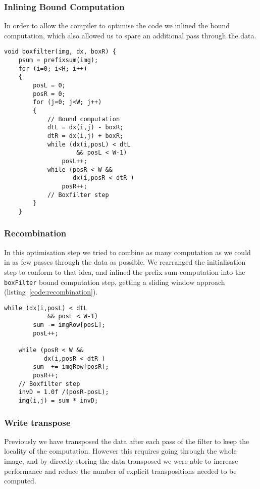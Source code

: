 \subsubsection{Inlining Bound Computation}

In order to allow the compiler to optimise the code we inlined the bound computation, which also allowed us to spare an additional pass through the data.

\begin{lstlisting}[caption=Inlining of the bound computation, label=code:inlining]
void boxfilter(img, dx, boxR) {
    psum = prefixsum(img);
    for (i=0; i<H; i++)
    {
        posL = 0;
        posR = 0;
        for (j=0; j<W; j++)
        {
            // Bound computation
            dtL = dx(i,j) - boxR;
            dtR = dx(i,j) + boxR;
            while (dx(i,posL) < dtL 
                    && posL < W-1)
                posL++;
            while (posR < W && 
                   dx(i,posR < dtR )
                posR++;
            // Boxfilter step
        }
    }
\end{lstlisting}

\subsubsection{Recombination}

In this optimisation step we tried to combine as many computation as we could in as few passes through the data as possible. We rearranged the initialisation step to conform to that idea, and inlined the prefix sum computation into the \lstinline{boxFilter} bound computation step, getting a sliding window approach (listing~\ref{code:recombination}).

\begin{lstlisting}[caption=Recombination, label=code:recombination]
    while (dx(i,posL) < dtL 
            && posL < W-1)
        sum -= imgRow[posL];
        posL++;

    while (posR < W && 
           dx(i,posR < dtR )
        sum  += imgRow[posR];
        posR++;
    // Boxfilter step
    invD = 1.0f /(posR-posL);
    img(i,j) = sum * invD;
\end{lstlisting}

\subsubsection{Write transpose}

Previously we have transposed the data after each pass of the filter to keep the locality of the computation. However this requires going through the whole image, and by directly storing the data transposed we were able to increase performance and reduce the number of explicit transpositions needed to be computed. 

